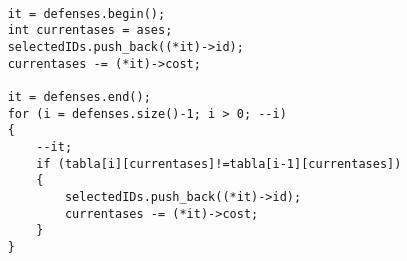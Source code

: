 \begin{lstlisting}

    it = defenses.begin();
    int currentases = ases;
    selectedIDs.push_back((*it)->id);
    currentases -= (*it)->cost;

    it = defenses.end();
    for (i = defenses.size()-1; i > 0; --i)
    {
        --it;
        if (tabla[i][currentases]!=tabla[i-1][currentases])
        {
            selectedIDs.push_back((*it)->id);
            currentases -= (*it)->cost;
        }
    }
\end{lstlisting}

